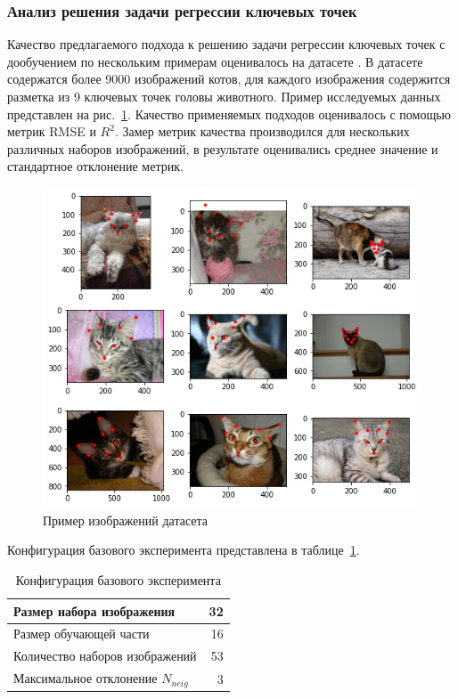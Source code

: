 \documentclass[a4paper,14pt]{article}
\begin{document}
    \subsubsection{Анализ решения задачи регрессии ключевых точек} \label{kpoints_exp}

    Качество предлагаемого подхода к решению задачи регрессии ключевых точек с дообучением по нескольким примерам оценивалось на датасете \cite{cat_dataset}.
    В датасете содержатся более 9000 изображений котов, для каждого изображения содержится разметка из 9 ключевых точек головы животного.
    Пример исследуемых данных представлен на рис.~\ref{fig:example_cat_dataset}.
    Качество применяемых подходов оценивалось с помощью метрик RMSE и $R^2$.
    Замер метрик качества производился для нескольких различных наборов изображений, в результате оценивались среднее значение и стандартное отклонение метрик.

    \begin{figure}[H]
        \centering
        \includegraphics[width=0.6\linewidth]{images/example_cat_dataset}
        \caption{Пример изображений датасета \cite{cat_dataset}}
        \label{fig:example_cat_dataset}
    \end{figure}

    Конфигурация базового эксперимента представлена в таблице~\ref{tab:base_config}.
    \begin{center}
        \begin{table}[H]
            \centering
            \caption{Конфигурация базового эксперимента}
            \label{tab:base_config}
            \bgroup
            \def\arraystretch{1.5}
            \begin{tabular}{| l | r |}
                \hline
                Размер набора изображения         & 32 \\ \hline
                Размер обучающей части            & 16 \\ \hline
                Количество наборов изображений    & 53 \\ \hline
                Максимальное отклонение  $N_{neig}$ & 3  \\
                \hline
            \end{tabular}
            \egroup
        \end{table}
    \end{center}
\end{document}
